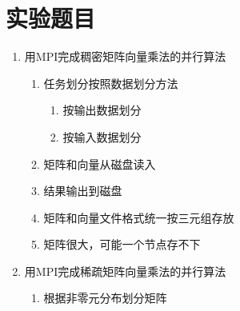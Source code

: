 \documentclass[UTF8,a4paper,12pt]{article}
\begin{document}
\begin{titlepage}
    \begin{center}
        \phantom{Start!}
    	  \vspace{2cm}
        {
            \setlength{\baselineskip}{40pt}
            \vspace{1cm}
        }
    \end{center}
\end{titlepage}

\section{实验题目}
\begin{enumerate}[itemindent=0.5em,label=(\arabic*)]
  \item 用MPI完成稠密矩阵向量乘法的并行算法
  \begin{enumerate}
    \item 任务划分按照数据划分方法
    \begin{enumerate}
      \item 按输出数据划分
      \item 按输入数据划分
    \end{enumerate}
    \item 矩阵和向量从磁盘读入
	  \item 结果输出到磁盘
    \item 矩阵和向量文件格式统一按三元组存放
    \item 矩阵很大，可能一个节点存不下
  \end{enumerate}
  \item 用MPI完成稀疏矩阵向量乘法的并行算法
  \begin{enumerate}
    \item 根据非零元分布划分矩阵
  \end{enumerate}
\end{enumerate}
\end{document}
